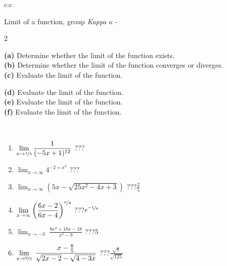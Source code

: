 \documentclass[10pt]{report}
\begin{document}
\newpage
\thispagestyle{empty}
\begin{tabular}{c:c}
\begin{minipage}[c][104.5mm][t]{0.5\linewidth}
\begin{center}
\vspace{5mm}
{\huge Limit of a function, group \textit{Kappa $\kappa$} -}\\[5mm]
\begin{minipage}{0.95\linewidth}
\begin{center}
{\small \begin{multicols}{2} \raggedright
\textbf{(a)} Determine whether the limit of the function exists. \\[1mm]
\textbf{(b)} Determine whether the limit of the function converges or diverges. \\[1mm]
\textbf{(c)} Evaluate the limit of the function. \par \columnbreak
\textbf{(d)} Evaluate the limit of the function. \\[1mm]
\textbf{(e)} Evaluate the limit of the function. \\[1mm]
\textbf{(f)} Evaluate the limit of the function. \\[1mm]
\end{multicols}
}
\end{center}
\end{minipage}
\\[1mm]
\begin{minipage}{0.79\linewidth}
\begin{center}
\begin{varwidth}{\linewidth}
\setlength{\itemsep}{0pt}
\begin{enumerate}
\normalsize
\item $\displaystyle\lim_{x\to\nicefrac{1}{5}}{\frac{1}{(-5x+1)^{12}}}$\quad \dotfill\; ???\;\dotfill \quad {}
\item $\displaystyle\lim_{x\to\infty}{4^{-2+x^2}}$\quad \dotfill\; ???\;\dotfill \quad {}
\item $\displaystyle\lim_{x\to\infty}{\left(5x - \sqrt{25x^2-4x+3}\right)}$\quad \dotfill\; ???\;\dotfill \quad $\frac{2}{5}$
\item $\displaystyle\lim_{x\to\infty}{\left( \frac{6x-2}{6x-4} \right)^{\nicefrac{x}{4}}}$\quad \dotfill\; ???\;\dotfill \quad $e^{\nicefrac{-1}{4}}$
\item $\displaystyle\lim_{x\to -3}{\;\frac{8x^2+18x-18}{x^2-9}}$\quad \dotfill\; ???\;\dotfill \quad $5$
\item $\displaystyle\lim_{x\to \nicefrac{6}{5}}{\;\frac{x-\frac{6}{5}}{\sqrt{2x-2} - \sqrt{4-3x}}}$\quad \dotfill\; ???\;\dotfill \quad $\frac{\sqrt{8}}{\sqrt{125}}$

\end{enumerate}
\end{varwidth}
\end{center}
\end{minipage}
\end{center}
\end{minipage}
\end{tabular}
\end{document}
